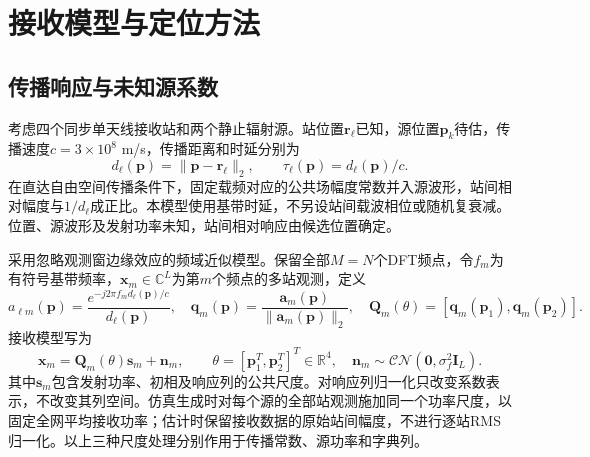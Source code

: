 \section{接收模型与定位方法}\label{sec:current-model}
\subsection{传播响应与未知源系数}
考虑四个同步单天线接收站和两个静止辐射源。站位置$\mathbf r_\ell$已知，源位置$\mathbf p_k$待估，传播速度$c=3\times10^8$ m/s，传播距离和时延分别为
\begin{equation}
d_\ell(\mathbf p)=\|\mathbf p-\mathbf r_\ell\|_2,\qquad
\tau_\ell(\mathbf p)=d_\ell(\mathbf p)/c.
\end{equation}
在直达自由空间传播条件下，固定载频对应的公共场幅度常数并入源波形，站间相对幅度与$1/d_\ell$成正比。本模型使用基带时延，不另设站间载波相位或随机复衰减。位置、源波形及发射功率未知，站间相对响应由候选位置确定。

采用忽略观测窗边缘效应的频域近似模型\cite{ref05,ref04}。保留全部$M=N$个DFT频点，令$f_m$为有符号基带频率，$\mathbf x_m\in\mathbb C^L$为第$m$个频点的多站观测，定义
\begin{equation}\label{eq:new-response}
a_{\ell m}(\mathbf p)=\frac{e^{-j2\pi f_m d_\ell(\mathbf p)/c}}{d_\ell(\mathbf p)},\quad
\mathbf q_m(\mathbf p)=\frac{\mathbf a_m(\mathbf p)}{\|\mathbf a_m(\mathbf p)\|_2},\quad
\mathbf Q_m(\theta)=[\mathbf q_m(\mathbf p_1),\mathbf q_m(\mathbf p_2)].
\end{equation}
接收模型写为
\begin{equation}\label{eq:new-model}
\mathbf x_m=\mathbf Q_m(\theta)\mathbf s_m+\mathbf n_m,\qquad
\theta=[\mathbf p_1^T,\mathbf p_2^T]^T\in\mathbb R^4,\quad
\mathbf n_m\sim\mathcal{CN}(\mathbf0,\sigma_f^2\mathbf I_L).
\end{equation}
其中$\mathbf s_m$包含发射功率、初相及响应列的公共尺度。对响应列归一化只改变系数表示，不改变其列空间。仿真生成时对每个源的全部站观测施加同一个功率尺度，以固定全网平均接收功率；估计时保留接收数据的原始站间幅度，不进行逐站RMS归一化。以上三种尺度处理分别作用于传播常数、源功率和字典列。

